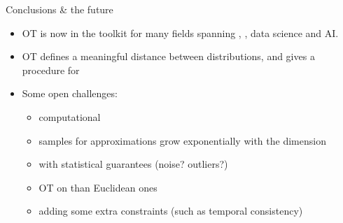 \documentclass[pdf,aspectratio=169,10pt]{beamer}
\begin{document}
\begin{frame}{Conclusions \& the future}
    \begin{itemize}
        \itemsep1em  
        \item OT is now in the toolkit for many fields spanning , , data science and AI.
        \item OT defines a meaningful distance between distributions, and gives a procedure for 
        \item Some open challenges: 
        \begin{itemize}
            \item computational 
            \item {} samples for approximations grow exponentially with the dimension
            \item {} with statistical guarantees (noise? outliers?)
            \item OT on  than Euclidean ones
            \item adding some extra constraints (such as temporal consistency)
        \end{itemize}
        \end{itemize}
\end{frame}











\begin{frame}[plain]
    \titlepage
\end{frame}



\appendix



\begin{frame}
    \Large {}
\end{frame}
\end{document}
